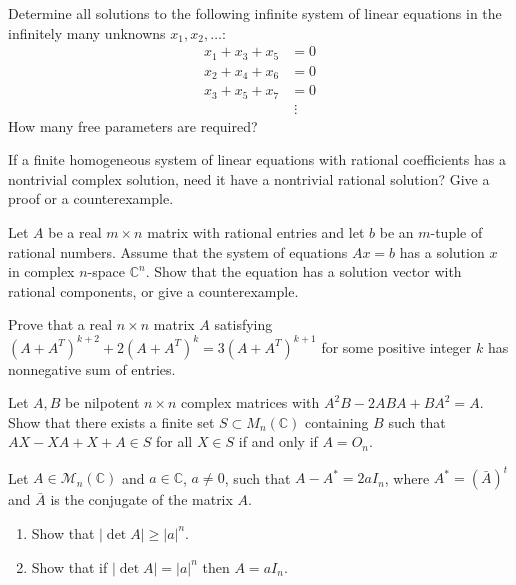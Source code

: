 \documentclass[12pt]{article}
\begin{document}
\begin{problem}
Determine all solutions to the following infinite system of linear equations in the infinitely many unknowns $x_1, x_2, \ldots$:
\[
\begin{aligned}
x_1 + x_3 + x_5 &= 0 \\
x_2 + x_4 + x_6 &= 0 \\
x_3 + x_5 + x_7 &= 0 \\
&\;\vdots
\end{aligned}
\]
How many free parameters are required?
\end{problem}

\begin{problem}
If a finite homogeneous system of linear equations with rational coefficients has a nontrivial complex solution, need it have a nontrivial rational solution? Give a proof or a counterexample.
\end{problem}

\begin{problem}
Let $A$ be a real $m \times n$ matrix with rational entries and let $b$ be an $m$-tuple of rational numbers. Assume that the system of equations $Ax = b$ has a solution $x$ in complex $n$-space $\mathbb{C}^n$. Show that the equation has a solution vector with rational components, or give a counterexample.
\end{problem}

\begin{problem}
Prove that a real $n\times n$ matrix $A$ satisfying $(A+A^T)^{k+2}+2(A+A^T)^k = 3(A+A^T)^{k+1}$ for some positive integer $k$ has nonnegative sum of entries.
\end{problem}

\begin{problem}
Let $A, B$ be nilpotent $n\times n$ complex matrices with $A^2B - 2ABA + BA^2 = A$. Show that there exists a finite set $S \subset M_n(\mathbb{C})$ containing $B$ such that $AX-XA+X+A \in S$ for all $X \in S$ if and only if $A = O_n$.
\end{problem}

\begin{problem}
Let $A \in \mathcal{M}_n(\mathbb{C})$ and $a \in \mathbb{C}$, $a \neq 0$, such that $A - A^* = 2aI_n$, where $A^* = (\bar{A})^t$ and $\bar{A}$ is the conjugate of the matrix $A$.
\begin{enumerate}[label=(\alph*)]
\item Show that $|\det A| \geq |a|^n$.
\item Show that if $|\det A| = |a|^n$ then $A = aI_n$.
\end{enumerate}
\end{problem}
\end{document}

